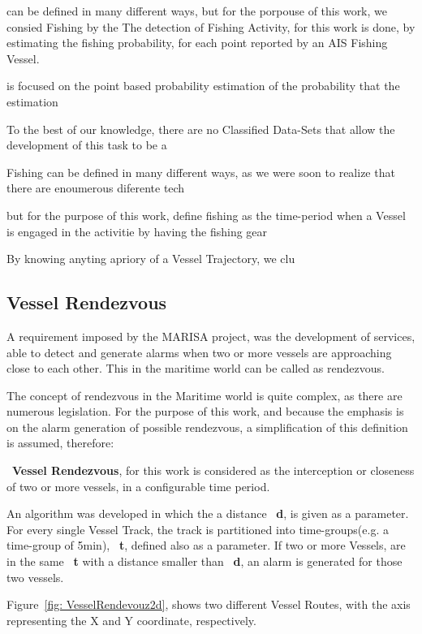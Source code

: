 can be defined in many different ways, but for the porpouse of this work, we consied Fishing by the 
The detection of Fishing Activity, for this work is done, by estimating the fishing probability, for each point reported by an AIS Fishing Vessel. 

is focused on the point based probability estimation of the probability that the estimation 

To the best of our knowledge, there are no Classified Data-Sets that allow the development of this task to be a 

Fishing can be defined in many different ways, as we were soon to realize that there are enoumerous diferente tech

but for the purpose of this work, define fishing as the time-period when a Vessel is engaged in the activitie by having the fishing gear 

By knowing anyting apriory of a Vessel Trajectory, we clu
\fi


\subsection{Vessel Rendezvous}
\label{subsection: 4 Vessel Rendezvous}
A requirement imposed by the MARISA project, was the development of services, able to detect and generate alarms when two or more vessels are approaching close to each other. This in the maritime world can be called as rendezvous.

The concept of rendezvous in the Maritime world is quite complex, as there are numerous legislation. For the purpose of this work, and because the emphasis is on the alarm generation of possible rendezvous, a simplification of this definition is assumed, therefore: 

~\textbf{Vessel Rendezvous}, for this work is considered as the interception or closeness of two or more vessels, in a configurable time period.

An algorithm was developed in which the a distance ~\textbf{d}, is given as a parameter. For every single Vessel Track, the track is partitioned into time-groups(e.g. a time-group of 5min), ~\textbf{t}, defined also as a parameter. If two or more Vessels, are in the same ~\textbf{t} with a distance smaller than ~\textbf{d}, an alarm is generated for those two vessels.

Figure~\ref{fig: VesselRendevouz2d}, shows two different Vessel Routes, with the axis representing the X and Y coordinate, respectively.

